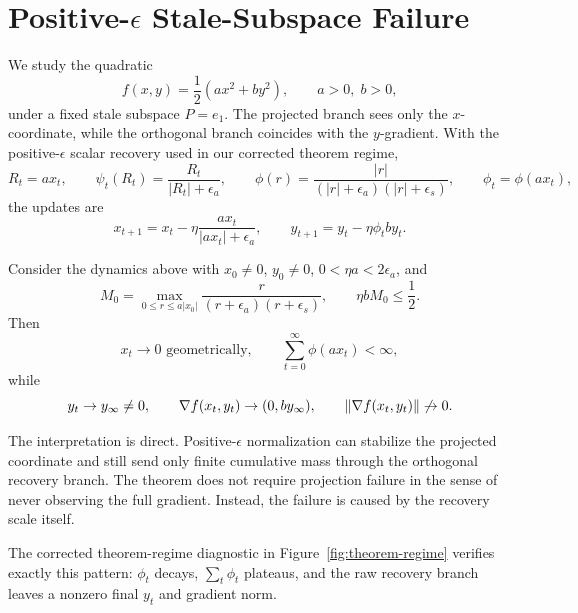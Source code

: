 \section{Positive-$\epsilon$ Stale-Subspace Failure}

We study the quadratic
\[
f(x,y)=\frac{1}{2}\left(a x^2 + b y^2\right),\qquad a>0,\; b>0,
\]
under a fixed stale subspace $P=e_1$. The projected branch sees only the
$x$-coordinate, while the orthogonal branch coincides with the $y$-gradient.
With the positive-$\epsilon$ scalar recovery used in our corrected theorem
regime,
\[
R_t = a x_t,\qquad
\psi_t(R_t)=\frac{R_t}{|R_t|+\epsilon_a},\qquad
\phi(r)=\frac{|r|}{(|r|+\epsilon_a)(|r|+\epsilon_s)},\qquad
\phi_t = \phi(a x_t),
\]
the updates are
\[
x_{t+1}=x_t-\eta \frac{a x_t}{|a x_t|+\epsilon_a},
\qquad
y_{t+1}=y_t-\eta \phi_t b y_t.
\]

\begin{theorem}
\label{thm:positive-epsilon-failure}
Consider the dynamics above with $x_0\neq 0$, $y_0\neq 0$,
$0<\eta a<2\epsilon_a$, and
\[
M_0 = \max_{0\le r\le a|x_0|}\frac{r}{(r+\epsilon_a)(r+\epsilon_s)},
\qquad
\eta b M_0 \le \frac{1}{2}.
\]
Then
\[
x_t \to 0 \text{ geometrically},\qquad
\sum_{t=0}^\infty \phi(a x_t) < \infty,
\]
while
\[
y_t \to y_\infty \neq 0,\qquad
\nabla f(x_t,y_t)\to (0,b y_\infty),\qquad
\left\lVert \nabla f(x_t,y_t) \right\rVert \not\to 0.
\]
\end{theorem}

The interpretation is direct. Positive-$\epsilon$ normalization can stabilize
the projected coordinate and still send only finite cumulative mass through the
orthogonal recovery branch. The theorem does not require projection failure in
the sense of never observing the full gradient. Instead, the failure is caused
by the recovery scale itself.

The corrected theorem-regime diagnostic in Figure~\ref{fig:theorem-regime}
verifies exactly this pattern: $\phi_t$ decays, $\sum_t \phi_t$ plateaus, and
the raw recovery branch leaves a nonzero final $y_t$ and gradient norm.
